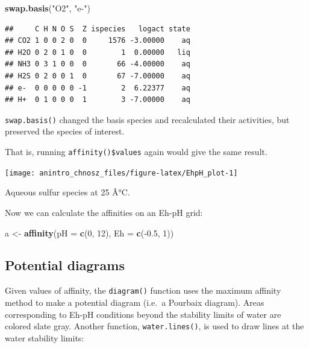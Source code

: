 \documentclass[]{tufte-handout}
\newenvironment{Shaded}{}{}
\newcommand{\KeywordTok}[1]{\textcolor[rgb]{0.00,0.44,0.13}{\textbf{#1}}}
\newcommand{\DataTypeTok}[1]{\textcolor[rgb]{0.56,0.13,0.00}{#1}}
\newcommand{\DecValTok}[1]{\textcolor[rgb]{0.25,0.63,0.44}{#1}}
\newcommand{\FloatTok}[1]{\textcolor[rgb]{0.25,0.63,0.44}{#1}}
\newcommand{\StringTok}[1]{\textcolor[rgb]{0.25,0.44,0.63}{#1}}
\newcommand{\OperatorTok}[1]{\textcolor[rgb]{0.40,0.40,0.40}{#1}}
\newcommand{\NormalTok}[1]{#1}
\begin{document}
\begin{Shaded}
\begin{Highlighting}[]
\KeywordTok{swap.basis}\NormalTok{(}\StringTok{"O2"}\NormalTok{, }\StringTok{"e-"}\NormalTok{)}
\end{Highlighting}
\end{Shaded}

\begin{verbatim}
##     C H N O S  Z ispecies   logact state
## CO2 1 0 0 2 0  0     1576 -3.00000    aq
## H2O 0 2 0 1 0  0        1  0.00000   liq
## NH3 0 3 1 0 0  0       66 -4.00000    aq
## H2S 0 2 0 0 1  0       67 -7.00000    aq
## e-  0 0 0 0 0 -1        2  6.22377    aq
## H+  0 1 0 0 0  1        3 -7.00000    aq
\end{verbatim}

{\texttt{swap.basis()}} changed the basis species and recalculated their
activities, but preserved the species of interest.

\begin{marginfigure}
That is, running {\texttt{affinity()}}\texttt{\$values} again would give
the same result.
\end{marginfigure}

\begin{marginfigure}
\texttt{[image: anintro\_chnosz\_files/figure-latex/EhpH\_plot-1]} \caption[Aqueous sulfur species at 25 Â°C]{Aqueous sulfur species at 25 Â°C.}\label{fig:EhpH_plot}
\end{marginfigure}

Now we can calculate the affinities on an Eh-pH grid:

\begin{Shaded}
\begin{Highlighting}[]
\NormalTok{a <-}\StringTok{ }\KeywordTok{affinity}\NormalTok{(}\DataTypeTok{pH =} \KeywordTok{c}\NormalTok{(}\DecValTok{0}\NormalTok{, }\DecValTok{12}\NormalTok{), }\DataTypeTok{Eh =} \KeywordTok{c}\NormalTok{(}\OperatorTok{-}\FloatTok{0.5}\NormalTok{, }\DecValTok{1}\NormalTok{))}
\end{Highlighting}
\end{Shaded}

\subsection{Potential diagrams}\label{potential-diagrams}

Given values of affinity, the {\texttt{diagram()}} function uses the
maximum affinity method to make a potential diagram (i.e.~a Pourbaix
diagram). Areas corresponding to Eh-pH conditions beyond the stability
limits of water are colored slate gray. Another function,
{\texttt{water.lines()}}, is used to draw lines at the water stability
limits:
\end{document}
